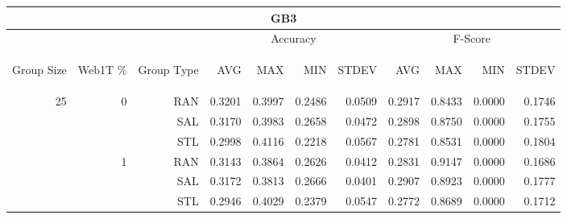 \begin{center}
\begin{table}[htbp]
\begin{tabular}{ | r | r | r | r | r | r | r | r | r | r | r |}
\hline
\multicolumn{11}{|c|}{GB3}\\
\hline
 & & & \multicolumn{4}{|c|}{Accuracy} & \multicolumn{4}{|c|}{F-Score}\\ \cline{4-11}
\begin{sideways}Group Size\end{sideways} & \begin{sideways}Web1T \%\end{sideways} & \begin{sideways}Group Type\end{sideways} & \begin{sideways}AVG\end{sideways} & \begin{sideways}MAX\end{sideways} & \begin{sideways}MIN\end{sideways} & \begin{sideways}STDEV\end{sideways} & \begin{sideways}AVG\end{sideways} & \begin{sideways}MAX\end{sideways} & \begin{sideways}MIN\end{sideways} & \begin{sideways}STDEV\end{sideways}\\
\hline
\multirow{15}{*}{25}
 & \multirow{3}{*}{0} & RAN & 0.3201 & 0.3997 & 0.2486 & 0.0509 & 0.2917 & 0.8433 & 0.0000 & 0.1746\\ \cline{3-11}
 &   & SAL & 0.3170 & 0.3983 & 0.2658 & 0.0472 & 0.2898 & 0.8750 & 0.0000 & 0.1755\\ \cline{3-11}
 &   & STL & 0.2998 & 0.4116 & 0.2218 & 0.0567 & 0.2781 & 0.8531 & 0.0000 & 0.1804\\ \cline{2-11}
 & \multirow{3}{*}{1} & RAN & 0.3143 & 0.3864 & 0.2626 & 0.0412 & 0.2831 & 0.9147 & 0.0000 & 0.1686\\ \cline{3-11}
 &   & SAL & 0.3172 & 0.3813 & 0.2666 & 0.0401 & 0.2907 & 0.8923 & 0.0000 & 0.1777\\ \cline{3-11}
 &   & STL & 0.2946 & 0.4029 & 0.2379 & 0.0547 & 0.2772 & 0.8689 & 0.0000 & 0.1712\\ \cline{2-11}

\end{tabular}
\end{table}
\end{center}

